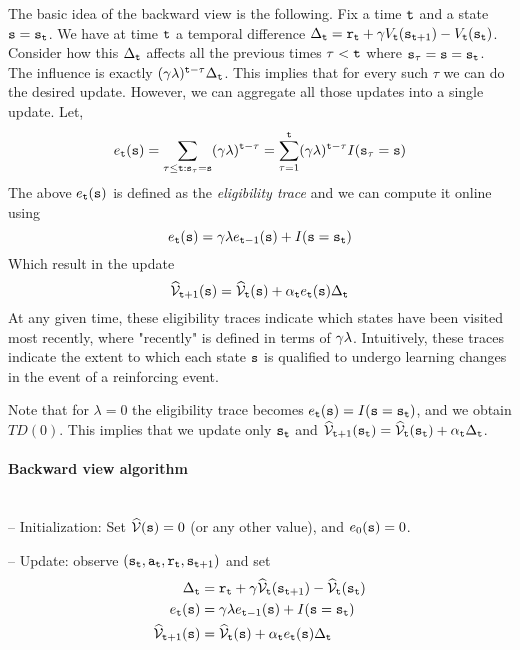 The basic idea of the backward view is the following. Fix a time
${\tt t}$ and a state ${\tt s}={\tt s}_{\tt t}$. We have at time
${\tt t}$ a temporal difference $\Delta_{\tt t}= {\tt r}_{\tt t}
+\gamma V_{\tt t}({\tt s}_{{\tt t}+1})-V_{\tt t}({\tt s}_{\tt t})$.
Consider how this $\Delta_{\tt t}$ affects all the previous times
$\tau<{\tt t}$ where ${\tt s}_\tau={\tt s}={\tt s}_{\tt t}$. The influence is
exactly $(\gamma\lambda)^{{\tt t}-\tau}\Delta_{\tt t}$. This implies
that for every such $\tau$ we can do the desired update. However, we
can aggregate all those updates into a single update. Let,
\[
e_{\tt t}({\tt s})=\sum_{\tau\leq {\tt t}: {\tt s}_\tau={\tt s}}
(\gamma\lambda)^{{\tt t}-\tau} = \sum_{\tau=1}^{\tt t}
(\gamma\lambda)^{{\tt t}-\tau}I({\tt s}_\tau={\tt s})
\]
The above $e_{\tt t}({\tt s})$ is defined as the {\em eligibility trace} and
we can compute it online using
\[
e_{\tt t}({\tt s})=\gamma\lambda
e_{{\tt t}-1}({\tt s})+I({\tt s}={\tt s}_{\tt t})
\]
Which result in the update
\[
\widehat{\mathcal{V}}_{{\tt t}+1}({\tt s})=\widehat{\mathcal{V}}_{\tt t}({\tt s})+\alpha_{\tt t}
e_{\tt t}({\tt s})\Delta_{\tt t}
\]
At any given time, these eligibility traces indicate which
states have been visited most recently, 
where "recently" is defined in terms of $\gamma\lambda$. 
Intuitively, these traces indicate the extent to which 
each state ${\tt s}$ is qualified to undergo learning changes
in the event of a reinforcing event.

Note that for $\lambda=0$ the eligibility
trace becomes $e_{\tt t}({\tt s})=I({\tt s}={\tt s}_{\tt t})$, and we obtain $TD(0)$. This
implies that we update only ${\tt s}_{\tt t}$ and
$\widehat{\mathcal{V}}_{{\tt t}+1}({\tt s}_{\tt t})=\widehat{\mathcal{V}}_{\tt t}({\tt s}_{\tt t})+\alpha_{\tt t}
\Delta_{\tt t}$.

\paragraph{Backward view algorithm}\ \\

 -- Initialization: Set $\widehat{\mathcal{V}}({\tt s})=0$ (or any other value), and
 $e_0({\tt s})=0$.

 -- Update: observe $({\tt s}_{\tt t},{\tt a}_{\tt t},{\tt r}_{\tt t},{\tt s}_{{\tt t}+1})$ and set
\begin{align*}
\Delta_{\tt t} &= {\tt r}_{\tt t} +\gamma \widehat{\mathcal{V}}_{\tt t}({\tt s}_{{\tt t}+1})-\widehat{\mathcal{V}}_{{\tt t}}({\tt s}_{\tt t})\\
e_{\tt t}({\tt s}) &= \gamma\lambda e_{{\tt t}-1}({\tt s})+I({\tt s}={\tt s}_{\tt t})\\
\widehat{\mathcal{V}}_{{\tt t}+1}({\tt s}) &=
\widehat{\mathcal{V}}_{\tt t}({\tt s})+\alpha_{\tt t} e_{\tt t}
({\tt s})\Delta_{\tt t}
\end{align*}

